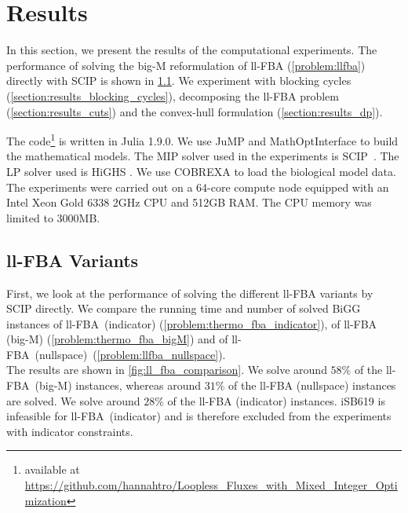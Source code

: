 \clearpage
\thispagestyle{plain}
\chapter{Results} \label{chap:results}

In this section, we present the results of the computational experiments. The performance of solving the big-M reformulation of \textsf{ll-FBA} (\cref{problem:llfba}) directly with \textsf{SCIP} is shown in \cref{section:methods_ll_fba_variants}. We experiment with blocking cycles (\cref{section:results_blocking_cycles}), decomposing the \textsf{ll-FBA} problem (\cref{section:results_cuts}) and the convex-hull formulation (\cref{section:results_dp}).

The code\footnote{available at \\ {\fontsize{9}{48}  \url{https://github.com/hannahtro/Loopless_Fluxes_with_Mixed_Integer_Optimization}}} is written in \textsf{Julia} 1.9.0. We use \textsf{JuMP} \cite{JuMP} and \textsf{MathOptInterface} \cite{mathoptinterface} to build the mathematical models. The MIP solver used in the experiments is \textsf{SCIP}~\cite{SCIP}. The LP solver used is \textsf{HiGHS} \cite{HiGHS}. We use \textsf{COBREXA} \cite{cobrexa} to load the biological model data.
The experiments were carried out on a 64-core compute node equipped with an Intel Xeon Gold 6338 2GHz CPU and 512GB RAM. The CPU memory was limited to 3000MB. 

\section{ll-FBA Variants} \label{section:methods_ll_fba_variants}
First, we look at the performance of solving the different \textsf{ll-FBA} variants by \textsf{SCIP} directly. We compare the running time and number of solved BiGG instances of \textsf{ll-FBA~(indicator)} (\cref{problem:thermo_fba_indicator}), of \textsf{ll-FBA (big-M)} (\cref{problem:thermo_fba_bigM}) and of \mbox{\textsf{ll-FBA (nullspace)} (\cref{problem:llfba_nullspace})}.\\
The results are shown in \cref{fig:ll_fba_comparison}.
We solve around $58\%$ of the \mbox{\textsf{ll-FBA (big-M)}} instances, whereas around $31\%$ of the \textsf{ll-FBA (nullspace)} instances are solved. We solve around $28\%$ of the \textsf{ll-FBA (indicator)} instances. \textsf{iSB619} is infeasible for \mbox{\textsf{ll-FBA (indicator)}} and is therefore excluded from the experiments with indicator constraints. %

